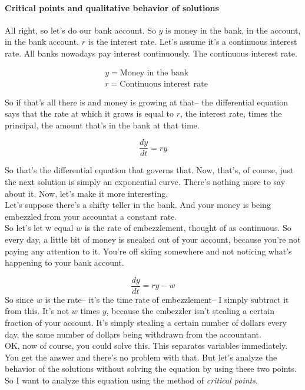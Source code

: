 \paragraph{Critical points and qualitative behavior of solutions}
All right, so let's do our bank account.
So $y$ is money in the bank, in the account, in the bank account.
$r$ is the interest rate.
Let's assume it's a continuous interest rate.
All banks nowadays pay interest continuously.
The continuous interest rate.

\begin{align*}
  &y = \text{Money in the bank} \\
  &r = \text{Continuous interest rate}
\end{align*}

So if that's all there is and money is growing at that-- the differential equation says
that the rate at which it grows is equal to $r$,
the interest rate, times the principal, the amount that's in the bank at that time.

\begin{equation*}
  \frac{dy}{dt} = ry 
\end{equation*}

So that's the differential equation that governs that.
Now, that's, of course, just the next solution is simply an exponential curve.
There's nothing more to say about it. Now, let's make it more interesting. \\

Let's suppose there's a shifty teller in the bank.
And your money is being embezzled from your accountat a constant rate.\\
So let's let w equal $w$ is the rate of embezzlement, thought of as continuous.
So every day, a little bit of money is sneaked out of your account, because you're not
paying any attention to it. You're off skiing somewhere and not
noticing what's happening to your bank account.

\begin{equation*}
  \frac{dy}{dt} = ry - w
\end{equation*}
So since $w$ is the rate--
it's the time rate of embezzlement-- I simply subtract it from this.
It's not $w$ times $y$, because the embezzler
isn't stealing a certain fraction of your account.
It's simply stealing a certain number of dollars every day,
the same number of dollars being withdrawn from the accountant.\\


OK, now of course, you could solve this.
This separates variables immediately.
You get the answer and there's no problem with that.
But let's analyze the behavior of the solutions
without solving the equation by using these two points.
So I want to analyze this equation using the method of \emph{critical points}.\\


